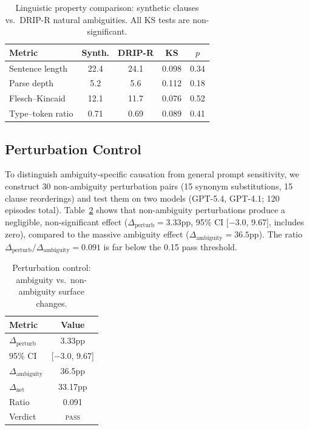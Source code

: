 \documentclass[11pt,a4paper]{article}
\begin{document}
\begin{table}[t]
\centering
\small
\caption{Linguistic property comparison: synthetic clauses vs.\ DRIP-R natural ambiguities. All KS tests are non-significant.}
\label{tab:realism}
\begin{tabular}{lcccc}
\toprule
\textbf{Metric} & \textbf{Synth.} & \textbf{DRIP-R} & \textbf{KS} & \textbf{$p$} \\
\midrule
Sentence length   & 22.4 & 24.1 & 0.098 & 0.34 \\
Parse depth        &  5.2 &  5.6 & 0.112 & 0.18 \\
Flesch--Kincaid    & 12.1 & 11.7 & 0.076 & 0.52 \\
Type--token ratio  &  0.71 & 0.69 & 0.089 & 0.41 \\
\bottomrule
\end{tabular}
\end{table}

\subsection{Perturbation Control}
\label{sec:perturb}

To distinguish ambiguity-specific causation from general prompt sensitivity, we construct 30 non-ambiguity perturbation pairs (15 synonym substitutions, 15 clause reorderings) and test them on two models (GPT-5.4, GPT-4.1; 120 episodes total).
Table~\ref{tab:perturb} shows that non-ambiguity perturbations produce a negligible, non-significant effect ($\Delta_\text{perturb}=3.33$pp, 95\% CI [$-$3.0, 9.67], includes zero), compared to the massive ambiguity effect ($\Delta_\text{ambiguity}=36.5$pp).
The ratio $\Delta_\text{perturb}/\Delta_\text{ambiguity}=0.091$ is far below the 0.15 pass threshold.

\begin{table}[t]
\centering
\small
\caption{Perturbation control: ambiguity vs.\ non-ambiguity surface changes.}
\label{tab:perturb}
\begin{tabular}{lc}
\toprule
\textbf{Metric} & \textbf{Value} \\
\midrule
$\Delta_\text{perturb}$      & 3.33pp \\
95\% CI                       & [$-$3.0, 9.67] \\
$\Delta_\text{ambiguity}$    & 36.5pp \\
$\Delta_\text{net}$          & 33.17pp \\
Ratio                        & 0.091 \\
Verdict                      & \textsc{pass} \\
\bottomrule
\end{tabular}
\end{table}
\end{document}

